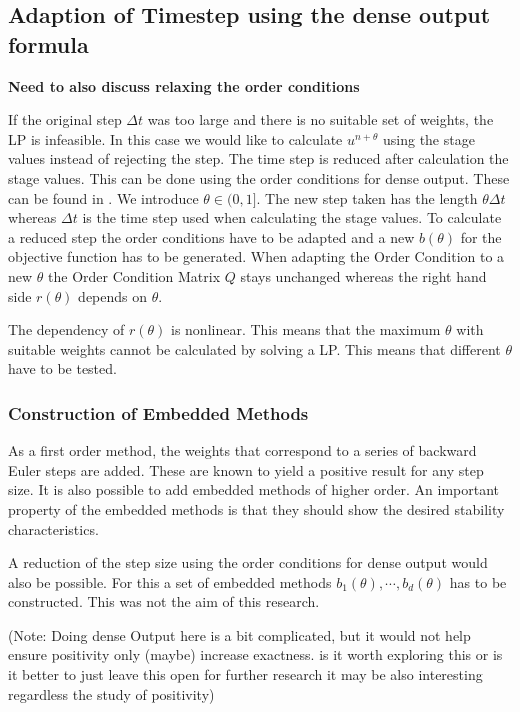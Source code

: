 \documentclass[a4paper]{article}
\numberwithin{equation}{section}
\theoremstyle{plain}
\theoremstyle{definition}
\numberwithin{theorem}{section}
\newcommand{\dt}{{\Delta t}}
\newcommand{\1}{\mathbbm{1}}
\begin{document}
\subsection{Adaption of Timestep using the dense output formula}

{\bf Need to also discuss relaxing the order conditions}

If the original step $\dt$ was too large and there is no suitable set of weights, the LP is infeasible. In this case we would like to calculate $u^{n+\theta}$ using the stage values instead of rejecting the step. The time step is reduced after calculation the stage values. This can be done using the order conditions for dense output. These can be found in \cite{hairer_solving_1993}.
We introduce $\theta \in (0,1]$. The new step taken has the length $\theta \dt$ whereas $\dt$ is the time step used when calculating the stage values.
To calculate a reduced step the order conditions have to be adapted and a new $b(\theta)$ for the objective function has to be generated. 
When adapting the Order Condition to a new $\theta$ the Order Condition Matrix $Q$ stays unchanged whereas the right hand side $r(\theta)$ depends on $\theta$.

The dependency of $r(\theta)$ is nonlinear. This means that the maximum $\theta$ with suitable weights cannot be calculated by solving a LP. This means that different $\theta$ have to be tested. 

\subsubsection{Construction of Embedded Methods}

As a first order method, the weights that correspond to a series of backward Euler steps are added. These are known to yield a positive result for any step size.
It is also possible to add embedded methods of higher order.
An important property of the embedded methods is that they should show the desired stability characteristics. 

A reduction of the step size using the order conditions for dense output would also be possible. For this a set of embedded methods $b_1(\theta),\cdots,b_d(\theta)$ has to be constructed. This was not the aim of this research.

(Note: Doing dense Output here is a bit complicated, but it would not help ensure positivity only (maybe) increase exactness.  is it worth exploring this or is it better to just leave this open for further research it may be also interesting regardless the study of positivity)
 
\end{document}
